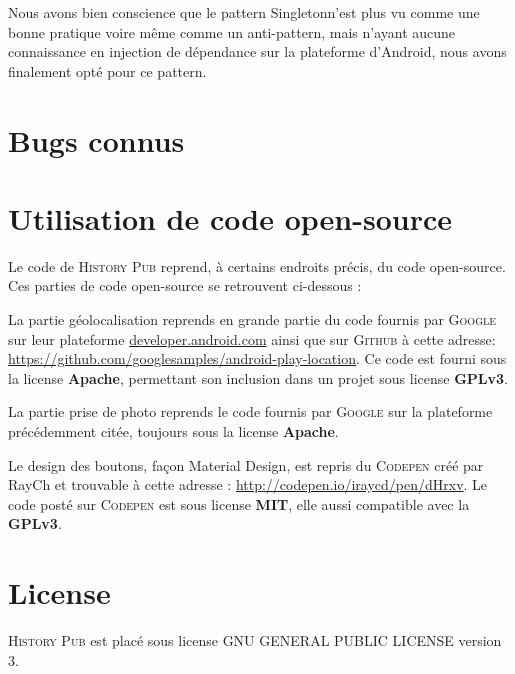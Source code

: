 \documentclass[11pt]{scrreprt}
\begin{document}
    Nous avons bien conscience que le pattern Singletonn'est plus vu comme une bonne pratique voire même comme un anti-pattern, mais n'ayant aucune connaissance en injection de dépendance sur la plateforme d'Android, nous avons finalement opté pour ce pattern.

    \chapter{Bugs connus}

    \chapter{Utilisation de code open-source}
    Le code de \textsc{History Pub} reprend, à certains endroits précis, du code open-source. Ces parties de code open-source se retrouvent ci-dessous :

    \begin{description}[style=nextline]
        \item[EtapeActivity.java et PhotoActivity.java] La partie géolocalisation reprends en grande partie du code fournis par \textsc{Google} sur leur plateforme \url{developer.android.com} ainsi que sur \textsc{Github} à cette adresse: \url{https://github.com/googlesamples/android-play-location}. Ce code est fourni sous la license \textbf{Apache}, permettant son inclusion dans un projet sous license \textbf{GPLv3}.
        \item[PhotoActivity.java] La partie prise de photo reprends le code fournis par \textsc{Google} sur la plateforme précédemment citée, toujours sous la license \textbf{Apache}.
        \item[Style.css] Le design des boutons, façon Material Design, est repris du \textsc{Codepen} créé par RayCh et trouvable à cette adresse : \url{http://codepen.io/iraycd/pen/dHrxv}. Le code posté sur \textsc{Codepen} est sous license \textbf{MIT}, elle aussi compatible avec la \textbf{GPLv3}.
    \end{description}

    \chapter{License}

    \noindent \textsc{History Pub} est placé sous license GNU GENERAL PUBLIC LICENSE version 3.
    \hfill\\
\end{document}
